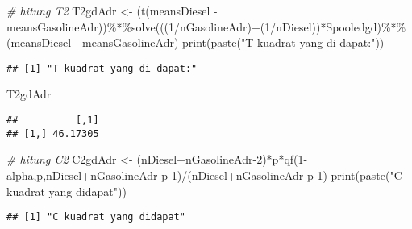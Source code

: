 \documentclass[
]{article}
\newenvironment{Shaded}{\begin{snugshade}}{\end{snugshade}}
\newcommand{\CommentTok}[1]{\textcolor[rgb]{0.56,0.35,0.01}{\textit{#1}}}
\newcommand{\DecValTok}[1]{\textcolor[rgb]{0.00,0.00,0.81}{#1}}
\newcommand{\FunctionTok}[1]{\textcolor[rgb]{0.00,0.00,0.00}{#1}}
\newcommand{\NormalTok}[1]{#1}
\newcommand{\OtherTok}[1]{\textcolor[rgb]{0.56,0.35,0.01}{#1}}
\newcommand{\SpecialCharTok}[1]{\textcolor[rgb]{0.00,0.00,0.00}{#1}}
\newcommand{\StringTok}[1]{\textcolor[rgb]{0.31,0.60,0.02}{#1}}
\begin{document}
\begin{Shaded}
\begin{Highlighting}[]
\CommentTok{\# hitung T2}
\NormalTok{T2gdAdr }\OtherTok{\textless{}{-}}\NormalTok{ (}\FunctionTok{t}\NormalTok{(meansDiesel }\SpecialCharTok{{-}}\NormalTok{ meansGasolineAdr))}\SpecialCharTok{\%*\%}\FunctionTok{solve}\NormalTok{(((}\DecValTok{1}\SpecialCharTok{/}\NormalTok{nGasolineAdr)}\SpecialCharTok{+}\NormalTok{(}\DecValTok{1}\SpecialCharTok{/}\NormalTok{nDiesel))}\SpecialCharTok{*}\NormalTok{Spooledgd)}\SpecialCharTok{\%*\%}\NormalTok{(meansDiesel }\SpecialCharTok{{-}}\NormalTok{ meansGasolineAdr)}
\FunctionTok{print}\NormalTok{(}\FunctionTok{paste}\NormalTok{(}\StringTok{"T kuadrat yang di dapat:"}\NormalTok{))}
\end{Highlighting}
\end{Shaded}

\begin{verbatim}
## [1] "T kuadrat yang di dapat:"
\end{verbatim}

\begin{Shaded}
\begin{Highlighting}[]
\NormalTok{T2gdAdr}
\end{Highlighting}
\end{Shaded}

\begin{verbatim}
##          [,1]
## [1,] 46.17305
\end{verbatim}

\begin{Shaded}
\begin{Highlighting}[]
\CommentTok{\# hitung C2}
\NormalTok{C2gdAdr }\OtherTok{\textless{}{-}}\NormalTok{ (nDiesel}\SpecialCharTok{+}\NormalTok{nGasolineAdr}\DecValTok{{-}2}\NormalTok{)}\SpecialCharTok{*}\NormalTok{p}\SpecialCharTok{*}\FunctionTok{qf}\NormalTok{(}\DecValTok{1}\SpecialCharTok{{-}}\NormalTok{alpha,p,nDiesel}\SpecialCharTok{+}\NormalTok{nGasolineAdr}\SpecialCharTok{{-}}\NormalTok{p}\DecValTok{{-}1}\NormalTok{)}\SpecialCharTok{/}\NormalTok{(nDiesel}\SpecialCharTok{+}\NormalTok{nGasolineAdr}\SpecialCharTok{{-}}\NormalTok{p}\DecValTok{{-}1}\NormalTok{)}
\FunctionTok{print}\NormalTok{(}\FunctionTok{paste}\NormalTok{(}\StringTok{"C kuadrat yang didapat"}\NormalTok{))}
\end{Highlighting}
\end{Shaded}

\begin{verbatim}
## [1] "C kuadrat yang didapat"
\end{verbatim}
\end{document}
